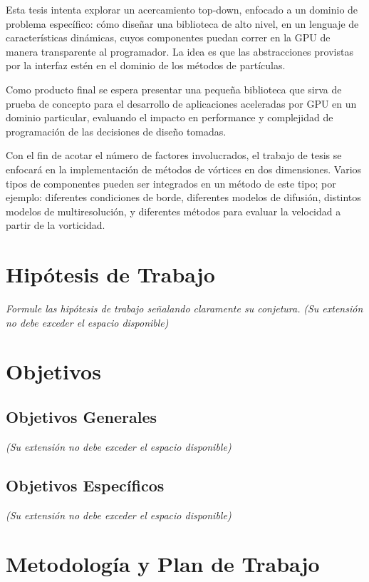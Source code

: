 \documentclass[11pt,spanish]{article}
\begin{document}
Esta tesis intenta explorar un acercamiento top-down, enfocado a un dominio de
problema específico: cómo diseñar una biblioteca de alto nivel, en un lenguaje
de características dinámicas, cuyos componentes puedan correr en la GPU de
manera transparente al programador.  La idea es que las abstracciones provistas
por la interfaz estén en el dominio de los métodos de partículas.

Como producto final se espera presentar una pequeña biblioteca que sirva de
prueba de concepto para el desarrollo de aplicaciones aceleradas por GPU en un
dominio particular, evaluando el impacto en performance y complejidad de
programación de las decisiones de diseño tomadas.

Con el fin de acotar el número de factores involucrados, el trabajo de tesis se
enfocará en la implementación de métodos de vórtices en dos dimensiones.  Varios
tipos de componentes pueden ser integrados en un método de este tipo; por
ejemplo: diferentes condiciones de borde, diferentes modelos de difusión,
distintos modelos de multiresolución, y diferentes métodos para evaluar la
velocidad a partir de la vorticidad.



\newpage
\section{Hipótesis de Trabajo}

\emph{Formule las hipótesis de trabajo señalando claramente su conjetura.}
\emph{(Su extensión no debe exceder el espacio disponible) }

\section{Objetivos }

\subsection{Objetivos Generales}

\emph{(Su extensión no debe exceder el espacio disponible)}

\subsection{Objetivos Específicos}

\emph{(Su extensión no debe exceder el espacio disponible) }
       

\section{Metodología y Plan de Trabajo}
\end{document}
